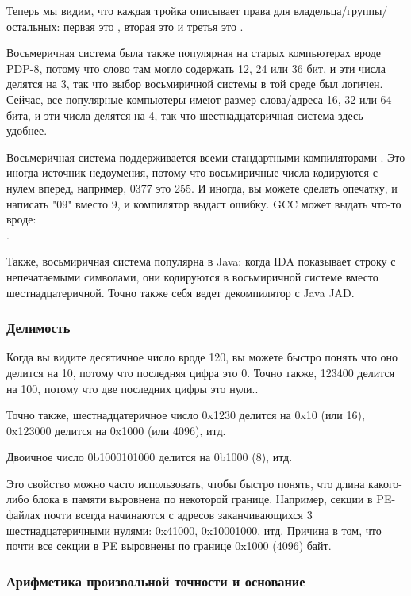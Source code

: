 Теперь мы видим, что каждая тройка описывает права для владельца/группы/остальных:
первая это , вторая это  и третья это .

Восьмеричная система была также популярная на старых компьютерах вроде PDP-8, потому что слово там могло содержать 12, 24 или
36 бит, и эти числа делятся на 3, так что выбор восьмиричной системы в той среде был логичен.
Сейчас, все популярные компьютеры имеют размер слова/адреса 16, 32 или 64 бита, и эти числа делятся на 4,
так что шестнадцатеричная система здесь удобнее.

Восьмеричная система поддерживается всеми стандартными компиляторами \CCpp{}.
Это иногда источник недоумения, потому что восьмиричные числа кодируются с нулем вперед, например, 0377 это 255.
И иногда, вы можете сделать опечатку, и написать "09" вместо 9, и компилятор выдаст ошибку.
GCC может выдать что-то вроде:\\
.

Также, восьмиричная система популярна в Java: когда IDA показывает строку с непечатаемыми символами,
они кодируются в восьмиричной системе вместо шестнадцатеричной.
Точно также себя ведет декомпилятор с Java JAD.

\subsubsection{Делимость}

Когда вы видите десятичное число вроде 120, вы можете быстро понять что оно делится на 10, потому что последняя цифра это 0.
Точно также, 123400 делится на 100, потому что две последних цифры это нули..

Точно также, шестнадцатеричное число 0x1230 делится на 0x10 (или 16), 0x123000 делится на 0x1000 (или 4096), итд.

Двоичное число 0b1000101000 делится на 0b1000 (8), итд.

Это свойство можно часто использовать, чтобы быстро понять,
что длина какого-либо блока в памяти выровнена по некоторой границе.
Например, секции в \ac{PE}-файлах почти всегда начинаются с адресов заканчивающихся 3 шестнадцатеричными нулями:
0x41000, 0x10001000, итд.
Причина в том, что почти все секции в \ac{PE} выровнены по границе 0x1000 (4096) байт.

\subsubsection{Арифметика произвольной точности и основание}

